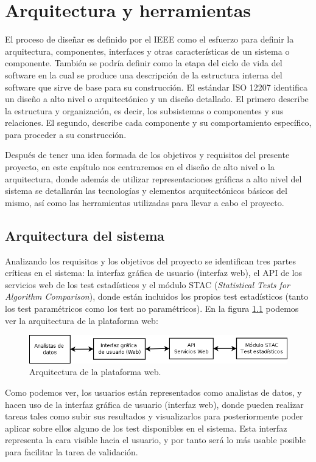 \chapter{Arquitectura y herramientas} \label{arquitecturayh}
El proceso de diseñar es definido por el IEEE como el esfuerzo para definir la arquitectura, componentes, interfaces y otras características de un sistema o componente. También se podría definir como la etapa del ciclo de vida del software en la cual se produce una descripción de la estructura interna del software que sirve de base para su construcción. El estándar ISO 12207 identifica un diseño a alto nivel o arquitectónico y un diseño detallado. El primero describe la estructura y organización, es decir, los subsistemas o componentes y sus relaciones. El segundo, describe cada componente y su comportamiento específico, para proceder a su construcción.

Después de tener una idea formada de los objetivos y requisitos del presente proyecto, en este capítulo nos centraremos en el diseño de alto nivel o la arquitectura, donde además de utilizar representaciones gráficas a alto nivel del sistema se detallarán las tecnologías y elementos arquitectónicos básicos del mismo, así como las herramientas utilizadas para llevar a cabo el proyecto.

\section{Arquitectura del sistema} \label{arquitectura}
Analizando los requisitos y los objetivos del proyecto se identifican tres partes críticas en el sistema: la interfaz gráfica de usuario (interfaz web), el API de los servicios web de los test estadísticos y el módulo STAC (\textit{Statistical Tests for Algorithm Comparison}), donde están incluidos los propios test estadísticos (tanto los test paramétricos como los test no paramétricos). En la figura \ref{fig:arquitectura} podemos ver la arquitectura de la plataforma web:

\begin{figure}[H]
\centering
\includegraphics[width=15cm]{figuras/arquitectura.png}
\caption{Arquitectura de la plataforma web.}
\label{fig:arquitectura}
\end{figure}

Como podemos ver, los usuarios están representados como analistas de datos, y hacen uso de la interfaz gráfica de usuario (interfaz web), donde pueden realizar tareas tales como subir sus resultados y visualizarlos para posteriormente poder aplicar sobre ellos alguno de los test disponibles en el sistema. Esta interfaz representa la cara visible hacia el usuario, y por tanto será lo más usable posible para facilitar la tarea de validación.

